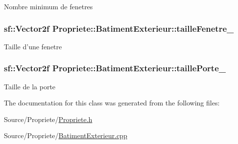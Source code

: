 Nombre minimum de fenetres \hypertarget{classPropriete_1_1BatimentExterieur_ad39b925ee0b514e4cf1ff27551ac5cce}{
\subsubsection[{taille\-Fenetre\-\_\-}]{\setlength{\rightskip}{0pt plus 5cm}sf\-::\-Vector2f Propriete\-::\-Batiment\-Exterieur\-::taille\-Fenetre\-\_\-\hspace{0.3cm}{\ttfamily [private]}}}\label{classPropriete_1_1BatimentExterieur_ad39b925ee0b514e4cf1ff27551ac5cce}
Taille d'une fenetre \hypertarget{classPropriete_1_1BatimentExterieur_af708f86509e6adad7f2230427cfa37c7}{
\subsubsection[{taille\-Porte\-\_\-}]{\setlength{\rightskip}{0pt plus 5cm}sf\-::\-Vector2f Propriete\-::\-Batiment\-Exterieur\-::taille\-Porte\-\_\-\hspace{0.3cm}{\ttfamily [private]}}}\label{classPropriete_1_1BatimentExterieur_af708f86509e6adad7f2230427cfa37c7}
Taille de la porte 

The documentation for this class was generated from the following files\-:\begin{DoxyCompactItemize}
\item 
Source/\-Propriete/\hyperlink{Propriete_8h}{Propriete.\-h}\item 
Source/\-Propriete/\hyperlink{Propriete_2BatimentExterieur_8cpp}{Batiment\-Exterieur.\-cpp}\end{DoxyCompactItemize}
